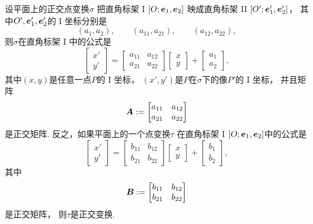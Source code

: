 \begin{theorem}
设平面上的正交点变换\(\sigma\)
把直角标架 I \([O;\boldsymbol{e}_1,\boldsymbol{e}_2]\)
映成直角标架 II \([O';\boldsymbol{e}'_1,\boldsymbol{e}'_2]\)，
其中\(O',\boldsymbol{e}'_1,\boldsymbol{e}'_2\)的 I 坐标分别是\begin{equation*}
	(a_1,a_2),
	\qquad
	(a_{11},a_{21}),
	\qquad
	(a_{12},a_{22}),
\end{equation*}
则\(\sigma\)在直角标架 I 中的公式是\begin{equation*}
	\begin{bmatrix}
		x' \\ y'
	\end{bmatrix}
	= \begin{bmatrix}
		a_{11} & a_{12} \\
		a_{21} & a_{22}
	\end{bmatrix}
	\begin{bmatrix}
		x \\ y
	\end{bmatrix}
	+ \begin{bmatrix}
		a_1 \\ a_2
	\end{bmatrix},
\end{equation*}
其中\((x,y)\)是任意一点\(P\)的 I 坐标，
\((x',y')\)是\(P\)在\(\sigma\)下的像\(P'\)的 I 坐标，
并且矩阵\begin{equation*}
	\boldsymbol{A} := \begin{bmatrix}
		a_{11} & a_{12} \\
		a_{21} & a_{22}
	\end{bmatrix}
\end{equation*}
是正交矩阵.
反之，如果平面上的一个点变换\(\tau\)
在直角标架 I \([O;\boldsymbol{e}_1,\boldsymbol{e}_2]\)中的公式是\begin{equation*}
	\begin{bmatrix}
		x' \\ y'
	\end{bmatrix}
	= \begin{bmatrix}
		b_{11} & b_{12} \\
		b_{21} & b_{22}
	\end{bmatrix}
	\begin{bmatrix}
		x \\ y
	\end{bmatrix}
	+ \begin{bmatrix}
		b_1 \\ b_2
	\end{bmatrix},
\end{equation*}
其中\begin{equation*}
	\boldsymbol{B} := \begin{bmatrix}
		b_{11} & b_{12} \\
		b_{21} & b_{22}
	\end{bmatrix}
\end{equation*}
是正交矩阵，
则\(\tau\)是正交变换.
\end{theorem}

